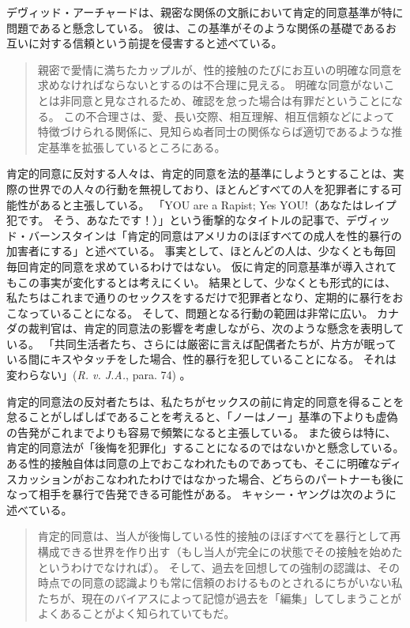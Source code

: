 \documentclass[paper=a4,book,openany]{jlreq} \usepackage{mystyle}
\begin{document}
デヴィッド・アーチャードは、親密な関係の文脈において肯定的同意基準が特に問題であると懸念している。
彼は、この基準がそのような関係の基礎であるお互いに対する信頼という前提を侵害すると述べている。

\begin{quote}
親密で愛情に満ちたカップルが、性的接触のたびにお互いの明確な同意を求めなければならないとするのは不合理に見える。
明確な同意がないことは非同意と見なされるため、確認を怠った場合は有罪だということになる。
この不合理さは、愛、長い交際、相互理解、相互信頼などによって特徴づけられる関係に、見知らぬ者同士の関係ならば適切であるような推定基準を拡張しているところにある。
\citep[p.146]{archard98:_sexual_consen}
\end{quote}

肯定的同意に反対する人々は、肯定的同意を法的基準にしようとすることは、実際の世界での人々の行動を無視しており、ほとんどすべての人を犯罪者にする可能性があると主張している。
「YOU are a Rapist; Yes YOU!（あなたはレイプ犯です。
そう、あなたです！）」という衝撃的なタイトルの記事で、デヴィッド・バーンスタインは「肯定的同意はアメリカのほぼすべての成人を性的暴行の加害者にする」と述べている\citep{bernstein14:_you_are_rapis}。
事実として、ほとんどの人は、少なくとも毎回毎回肯定的同意を求めているわけではない。
仮に肯定的同意基準が導入されてもこの事実が変化するとは考えにくい。
結果として、少なくとも形式的には、私たちはこれまで通りのセックスをするだけで犯罪者となり、定期的に暴行をおこなっていることになる。
そして、問題となる行動の範囲は非常に広い。
カナダの裁判官は、肯定的同意法の影響を考慮しながら、次のような懸念を表明している。
「共同生活者たち、さらには厳密に言えば配偶者たちが、片方が眠っている間にキスやタッチをした場合、性的暴行を犯していることになる。
それは変わらない」(\emph{R. v. J.A.},  para. 74) 。

肯定的同意法の反対者たちは、私たちがセックスの前に肯定的同意を得ることを怠ることがしばしばであることを考えると、「ノーはノー」基準の下よりも虚偽の告発がこれまでよりも容易で頻繁になると主張している。
また彼らは特に、肯定的同意法が「後悔を犯罪化」することになるのではないかと懸念している。
ある性的接触自体は同意の上でおこなわれたものであっても、そこに明確なディスカッションがおこなわれたわけではなかった場合、どちらのパートナーも後になって相手を暴行で告発できる可能性がある。
キャシー・ヤングは次のように述べている。

\begin{quote}
肯定的同意は、当人が後悔している性的接触のほぼすべてを暴行として再構成できる世界を作り出す（もし当人が完全にの状態でその接触を始めたというわけでなければ）。
そして、過去を回想しての強制の認識は、その時点での同意の認識よりも常に信頼のおけるものとされるにちがいない{\DDASH}私たちが、現在のバイアスによって記憶が過去を「編集」してしまうことがよくあることがよく知られていてもだ。
\citep{young15:_femin_want_us_defin_these}
\end{quote}
\end{document}
